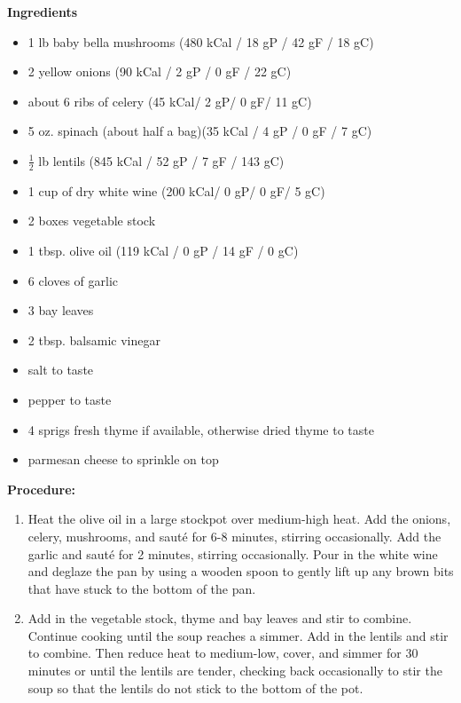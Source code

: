 \documentclass{report}
\begin{document}


\bigskip

\bigskip

\begin{multicols}{2}
\textbf{Ingredients}
\begin{itemize}
\item 1 lb baby bella mushrooms \newline (480 kCal / 18 gP / 42 gF / 18 gC)

\item 2 yellow onions \quad (90 kCal / 2 gP / 0 gF / 22 gC)
\item about 6 ribs of celery \quad (45 kCal/ 2 gP/ 0 gF/ 11 gC)
\item 5 oz. spinach (about half a bag)\newline (35 kCal / 4 gP / 0 gF / 7 gC)
\item $\frac{1}{2}$ lb lentils \quad (845 kCal / 52 gP / 7 gF / 143 gC)
\item 1 cup of dry white wine \quad (200 kCal/ 0 gP/ 0 gF/ 5 gC)
\item 2 boxes vegetable stock
\item 1 tbsp. olive oil \quad (119 kCal / 0 gP / 14 gF / 0 gC)
\item 6 cloves of garlic
\item 3 bay leaves
\item 2 tbsp. balsamic vinegar
\item salt to taste
\item pepper to taste
\item 4 sprigs fresh thyme if available, otherwise dried thyme to taste
\item parmesan cheese to sprinkle on top 


\end{itemize}


\columnbreak
\textbf{Procedure:}
\medskip


\begin{enumerate}
\item Heat the olive oil in a large stockpot over medium-high heat.  Add the onions, celery, mushrooms, and sauté for 6-8 minutes, stirring occasionally.  Add the garlic and sauté for 2 minutes, stirring occasionally.  Pour in the white wine and deglaze the pan by using a wooden spoon to gently lift up any brown bits that have stuck to the bottom of the pan. 

\item Add in the vegetable stock, thyme and bay leaves and stir to combine.  Continue cooking until the soup reaches a simmer.  Add in the lentils and stir to combine.  Then reduce heat to medium-low, cover, and simmer for 30 minutes or until the lentils are tender, checking back occasionally to stir the soup so that the lentils do not stick to the bottom of the pot.


\end{enumerate}
\end{multicols}
\end{document}
